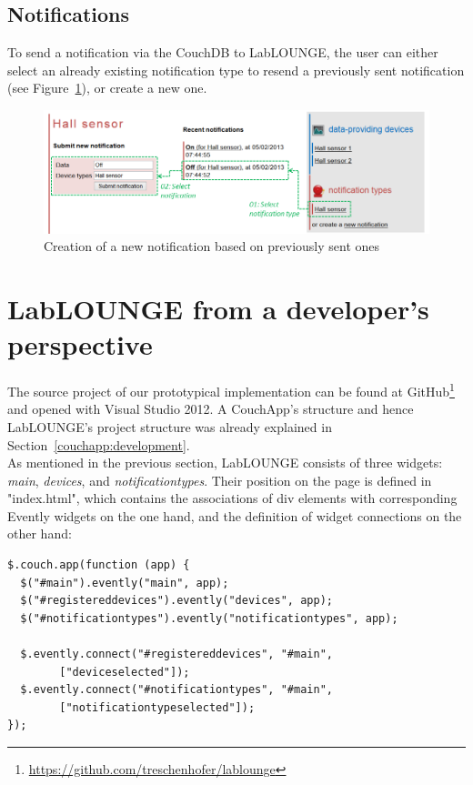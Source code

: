 \subsection{Notifications}
To send a notification via the CouchDB to LabLOUNGE, the user can either select an already existing notification type to resend a previously sent notification (see Figure~\ref{img:labloungenotification}), or create a new one.\\
\begin{figure}[h!]
\centering
\includegraphics[width=1.0\columnwidth]{images/labloungenotification.png}
\caption{Creation of a new notification based on previously sent ones}
\label{img:labloungenotification}
\end{figure}

\section{LabLOUNGE from a developer's perspective}
\label{couchapp:labloungedeveloper}
The source project of our prototypical implementation can be found at GitHub\footnote{\url{https://github.com/treschenhofer/lablounge}} and opened with Visual Studio 2012. A CouchApp's structure and hence LabLOUNGE's project structure was already explained in Section~\ref{couchapp:development}.\\
As mentioned in the previous section, LabLOUNGE consists of three widgets: \emph{main}, \emph{devices}, and \emph{notificationtypes}. Their position on the page is defined in "index.html", which contains the associations of div elements with corresponding Evently widgets on the one hand, and the definition of widget connections on the other hand:
\begin{lstlisting}
$.couch.app(function (app) {
  $("#main").evently("main", app);
  $("#registereddevices").evently("devices", app);
  $("#notificationtypes").evently("notificationtypes", app);

  $.evently.connect("#registereddevices", "#main", 
		["deviceselected"]);
  $.evently.connect("#notificationtypes", "#main", 
		["notificationtypeselected"]);
});
\end{lstlisting}

